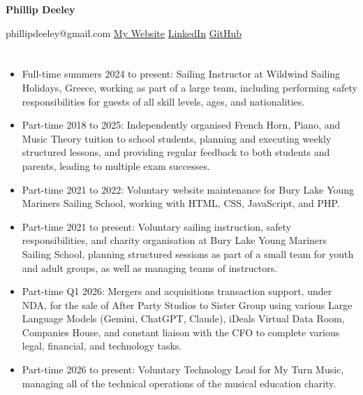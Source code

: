 \documentclass[a4paper,11pt]{article}
\newcommand{\bulletpoint}{
    {\large $\triangleright$}
}
\newcommand{\sepspace}{\vspace*{0.3em}}
\newcommand{\PersonalInfo}[5]{
    \Huge \usefont{OT1}{phv}{m}{n} \textbf{#1}

    \large \usefont{OT1}{phv}{m}{n}
    \hfill #2 \hspace{10pt} #3 \hspace{10pt} #4 \hspace{10pt} #5
}
\newcommand{\NewPart}[1]{
    \vspace{-0.6em}
    \section*{\MakeUpperCase{#1}}
    \vspace{-0.4em}
}
\begin{document}
\PersonalInfo
{Phillip Deeley}
{phillipdeeley@gmail.com}
{\href{https://www.phillipdeeley.com}{My Website}}
{\href{https://www.linkedin.com/in/phillip-deeley/}{LinkedIn}}
{\href{https://github.com/pdeeley3}{GitHub}}

\sepspace

\NewPart{Work \& Experience}

\begin{itemize}
    \item[\bulletpoint] Full-time summers 2024 to present: Sailing Instructor at Wildwind Sailing Holidays, Greece, working as part of a large team, including performing safety responsibilities for guests of all skill levels, ages, and nationalities.

    \item[\bulletpoint] Part-time 2018 to 2025: Independently organised French Horn, Piano, and Music Theory tuition to school students, planning and executing weekly structured lessons, and providing regular feedback to both students and parents, leading to multiple exam successes.

    \item[\bulletpoint] Part-time 2021 to 2022: Voluntary website maintenance for Bury Lake Young Mariners Sailing School, working with HTML, CSS, JavaScript, and PHP.

    \item[\bulletpoint] Part-time 2021 to present: Voluntary sailing instruction, safety responsibilities, and charity organisation at Bury Lake Young Mariners Sailing School, planning structured sessions as part of a small team for youth and adult groups, as well as managing teams of instructors.

    \item[\bulletpoint] Part-time Q1 2026: Mergers and acquisitions transaction support, under NDA, for the sale of After Party Studios to Sister Group using various Large Language Models (Gemini, ChatGPT, Claude), iDeals Virtual Data Room, Companies House, and constant liaison with the CFO to complete various legal, financial, and technology tasks.

    \item[\bulletpoint] Part-time 2026 to present: Voluntary Technology Lead for My Turn Music, managing all of the technical operations of the musical education charity.
\end{itemize}

\sepspace

\NewPart{Education}
\end{document}
